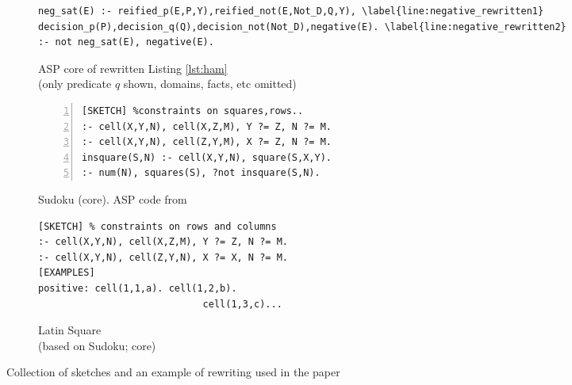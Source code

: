 \begin{figure*}[htb]
\begin{subfigure}[t]{0.645\textwidth}
\begin{Verbatim}[fontsize=\scriptsize,commandchars=\\\{\}]
neg_sat(E) :- reified_p(E,P,Y),reified_not(E,Not_D,Q,Y), \label{line:negative_rewritten1}
decision_p(P),decision_q(Q),decision_not(Not_D),negative(E). \label{line:negative_rewritten2}
:- not neg_sat(E), negative(E).
\end{Verbatim}
\caption{ASP core of rewritten Listing \protect\ref{lst:ham}\\(only predicate $q$ shown, domains, facts, etc omitted)} \label{lst:rewriting}
\end{subfigure}
\hrulesep
\begin{subfigure}[t]{0.49\textwidth}
  \renewcommand{\figurename}{Sketch}
  \vspace{2pt}
\begin{Verbatim}[fontsize=\scriptsize,numbers=left,xleftmargin=0mm]
[SKETCH] %constraints on squares,rows..
:- cell(X,Y,N), cell(X,Z,M), Y ?= Z, N ?= M.
:- cell(X,Y,N), cell(Z,Y,M), X ?= Z, N ?= M.
insquare(S,N) :- cell(X,Y,N), square(S,X,Y).
:- num(N), squares(S), ?not insquare(S,N). 
\end{Verbatim}
\caption{Sudoku (core). ASP code from\\\protect \parencite{asp_tutorial_sudoku}} \label{lst:sudoku}
\end{subfigure} 
\begin{subfigure}[t]{0.44\textwidth}
  \vspace{2pt}
  \renewcommand{\figurename}{Listing}
\begin{Verbatim}[fontsize=\scriptsize]
[SKETCH] % constraints on rows and columns
:- cell(X,Y,N), cell(X,Z,M), Y ?= Z, N ?= M.
:- cell(X,Y,N), cell(Z,Y,N), X ?= X, N ?= M.
[EXAMPLES]
positive: cell(1,1,a). cell(1,2,b). 
                             cell(1,3,c)...
\end{Verbatim}
\caption{Latin Square \\(based on Sudoku; core)} \label{lst:latin_square}
\end{subfigure}

\caption{Collection of sketches and an example of rewriting used in the paper}
\label{fig:table_with_sketches}
\end{figure*}
